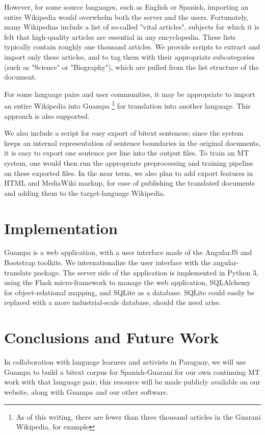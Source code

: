 \documentclass[10pt, a4paper]{article}
\begin{document}
However, for some source languages, such as English or Spanish, importing an
entire Wikipedia would overwhelm both the server and the users. Fortunately,
many Wikipedias include a list of so-called "vital articles", subjects for
which it is felt that high-quality articles are essential in any encyclopedia.
These lists typically contain roughly one thousand articles. We provide scripts
to extract and import only these articles, and to tag them with their
appropriate subcategories (such as "Science" or "Biography"), which are pulled
from the list structure of the document.

For some language pairs and user communities, it may be appropriate to import
an entire Wikipedia into Guampa \footnote{As of this writing, there are fewer
than three thousand articles in the Guarani Wikipedia, for example} for
translation into another language. This approach is also supported.

We also include a script for easy export of bitext sentences; since the system
keeps an internal representation of sentence boundaries in the original
documents, it is easy to export one sentence per line into the output files. To
train an MT system, one would then run the appropriate preprocessing and
training pipeline on these exported files. In the near term, we also plan to
add export features in HTML and MediaWiki markup, for ease of publishing the
translated documents and adding them to the target-language Wikipedia.


\section{Implementation}
Guampa is a web application, with a user interface made of the AngularJS and
Bootstrap toolkits. We internationalize the user interface with the
angular-translate package. The server side of the application is implemented in
Python 3, using the Flask micro-framework to manage the web application,
SQLAlchemy for object-relational mapping, and SQLite as a database. SQLite
could easily be replaced with a more industrial-scale database, should the need
arise.




\section{Conclusions and Future Work}
In collaboration with language learners and activists in Paraguay, we will use
Guampa to build a bitext corpus for Spanish-Guarani for our own continuing MT
work with that language pair; this resource will be made publicly available on
our website, along with Guampa and our other software.
\end{document}
